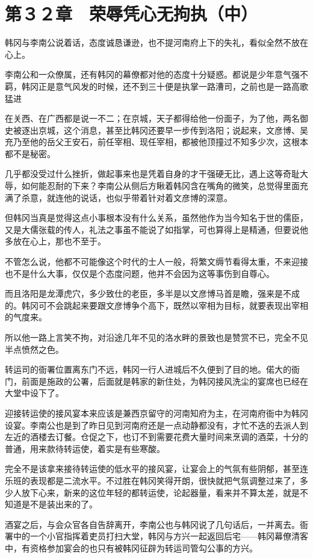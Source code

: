 \section{第３２章　荣辱凭心无拘执（中）}

韩冈与李南公说着话，态度诚恳谦逊，也不提河南府上下的失礼，看似全然不放在心上。

李南公和一众僚属，还有韩冈的幕僚都对他的态度十分疑惑。都说是少年意气强不羁，韩冈正是意气风发的时候，还不到三十便是执掌一路漕司，之前也是一路高歌猛进

在关西、在广西都是说一不二；在京城，天子都得给他一份面子，为了他，两名御史被逐出京城，这个消息，甚至比韩冈还要早一步传到洛阳；说起来，文彦博、吴充乃至他的岳父王安石，前任宰相、现任宰相，都被他顶撞过不知多少次，这根本都不是秘密。

几乎都没受过什么挫折，做起事来也是凭着自身的才干强硬无比，遇上这等奇耻大辱，如何能忍耐的下来？李南公从侧后方瞅着韩冈含在嘴角的微笑，总觉得里面充满了杀意，就连他的说话，也似乎带着针对着文彦博的深意。

但韩冈当真是觉得这点小事根本没有什么关系，虽然他作为当今知名于世的儒臣，又是大儒张载的传人，礼法之事虽不能说了如指掌，可也算得上是精通，但要说他多放在心上，那也不至于。

不管怎么说，他都不可能像这个时代的士人一般，将繁文缛节看得太重，不来迎接也不是什么大事，仅仅是个态度问题，他并不会因为这等事伤到自尊心。

而且洛阳是龙潭虎穴，多少致仕的老臣，多半是以文彦博马首是瞻，强来是不成的。韩冈可不会跳起来要跟文彦博争个高下，既然以宰相为目标，就要表现出宰相的气度来。

所以他一路上言笑不拘，对沿途几年不见的洛水畔的景致也是赞赏不已，完全不见半点愤然之色。

转运司的衙署位置离东门不远，韩冈一行人进城后不久便到了目的地。偌大的衙门，前面是施政的公署，后面就是韩家的新住处，为韩冈接风洗尘的宴席也已经在大堂中设下了。

迎接转运使的接风宴本来应该是兼西京留守的河南知府为主，在河南府衙中为韩冈设宴。李南公也是到了昨日见到河南府还是一点动静都没有，才忙不迭的去派人到左近的酒楼去订餐。仓促之下，也订不到需要花费大量时间来烹调的酒菜，十分的普通，用来款待转运使，着实是有些寒酸。

完全不是该拿来接待转运使的低水平的接风宴，让宴会上的气氛有些阴郁，甚至连乐班的表现都是二流水平。不过胜在韩冈笑得开朗，很快就把气氛调整过来了，多少人放下心来，新来的这位年轻的都转运使，论起器量，看来并不算太差，就是不知道是不是装出来的了。

酒宴之后，与会众官各自告辞离开，李南公也与韩冈说了几句话后，一并离去。衙署中的一个小官指挥着吏员打扫大堂，韩冈与方兴一起返回后宅——韩冈幕僚清客中，有资格参加宴会的也只有被韩冈征辟为转运司管勾公事的方兴。

